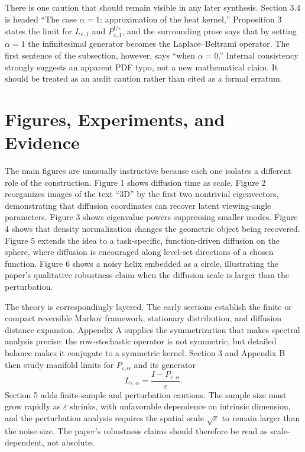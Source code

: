 \documentclass[11pt]{article}
\begin{document}
There is one caution that should remain visible in any later synthesis.
Section 3.4 is headed ``The case $\alpha=1$: approximation of the heat
kernel,'' Proposition 3 states the limit for $L_{\varepsilon,1}$ and
$P_{\varepsilon,1}^{t/\varepsilon}$, and the surrounding prose says that by
setting $\alpha=1$ the infinitesimal generator becomes the
Laplace--Beltrami operator.  The first sentence of the subsection, however,
says ``when $\alpha=0$.''  Internal consistency strongly suggests an apparent
PDF typo, not a new mathematical claim.  It should be treated as an audit
caution rather than cited as a formal erratum.

\section{Figures, Experiments, and Evidence}

The main figures are unusually instructive because each one isolates a
different role of the construction.  Figure 1 shows diffusion time as scale.
Figure 2 reorganizes images of the text ``3D'' by the first two nontrivial
eigenvectors, demonstrating that diffusion coordinates can recover latent
viewing-angle parameters.  Figure 3 shows eigenvalue powers suppressing
smaller modes.  Figure 4 shows that density normalization changes the
geometric object being recovered.  Figure 5 extends the idea to a
task-specific, function-driven diffusion on the sphere, where diffusion is
encouraged along level-set directions of a chosen function.  Figure 6 shows a
noisy helix embedded as a circle, illustrating the paper's qualitative
robustness claim when the diffusion scale is larger than the perturbation.

The theory is correspondingly layered.  The early sections establish the
finite or compact reversible Markov framework, stationary distribution, and
diffusion distance expansion.  Appendix A supplies the symmetrization that
makes spectral analysis precise: the row-stochastic operator is not symmetric,
but detailed balance makes it conjugate to a symmetric kernel.  Section 3 and
Appendix B then study manifold limits for $P_{\varepsilon,\alpha}$ and its
generator
\[
  L_{\varepsilon,\alpha}
  =
  \frac{I-P_{\varepsilon,\alpha}}{\varepsilon}.
\]
Section 5 adds finite-sample and perturbation cautions.  The sample size must
grow rapidly as $\varepsilon$ shrinks, with unfavorable dependence on
intrinsic dimension, and the perturbation analysis requires the spatial scale
$\sqrt{\varepsilon}$ to remain larger than the noise size.  The paper's
robustness claims should therefore be read as scale-dependent, not absolute.
\end{document}
